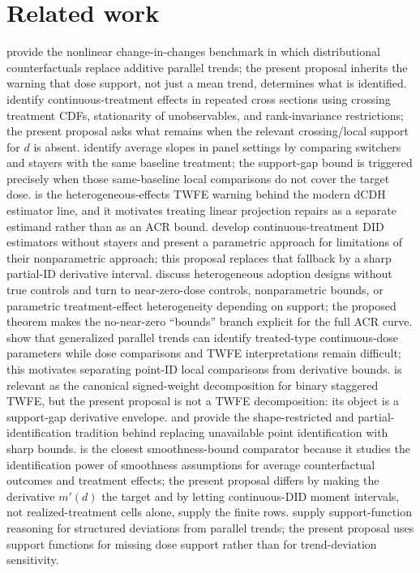 \documentclass[11pt]{article}
\theoremstyle{definition}
\theoremstyle{plain}
\theoremstyle{remark}
\begin{document}
\section{Related work}
\citet{AtheyImbens2006} provide the nonlinear change-in-changes benchmark in which distributional counterfactuals replace additive parallel trends; the present proposal inherits the warning that dose support, not just a mean trend, determines what is identified.  \citet{DHaultfoeuilleHoderleinSasaki2023} identify continuous-treatment effects in repeated cross sections using crossing treatment CDFs, stationarity of unobservables, and rank-invariance restrictions; the present proposal asks what remains when the relevant crossing/local support for \(d\) is absent.  \citet{deChaisemartinDHaultfoeuillePasquierSowVazquezBare2022} identify average slopes in panel settings by comparing switchers and stayers with the same baseline treatment; the support-gap bound is triggered precisely when those same-baseline local comparisons do not cover the target dose.  \citet{DCDH2020} is the heterogeneous-effects TWFE warning behind the modern dCDH estimator line, and it motivates treating linear projection repairs as a separate estimand rather than as an ACR bound.  \citet{deChaisemartinDHaultfoeuilleVazquezBare2024} develop continuous-treatment DID estimators without stayers and present a parametric approach for limitations of their nonparametric approach; this proposal replaces that fallback by a sharp partial-ID derivative interval.  \citet{deChaisemartinCicciaDHaultfoeuilleKnau2024} discuss heterogeneous adoption designs without true controls and turn to near-zero-dose controls, nonparametric bounds, or parametric treatment-effect heterogeneity depending on support; the proposed theorem makes the no-near-zero ``bounds'' branch explicit for the full ACR curve.  \citet{CallawayGoodmanBaconSantAnna2024} show that generalized parallel trends can identify treated-type continuous-dose parameters while dose comparisons and TWFE interpretations remain difficult; this motivates separating point-ID local comparisons from derivative bounds.  \citet{GoodmanBacon2021} is relevant as the canonical signed-weight decomposition for binary staggered TWFE, but the present proposal is not a TWFE decomposition: its object is a support-gap derivative envelope.  \citet{Manski1997} and \citet{Manski2003} provide the shape-restricted and partial-identification tradition behind replacing unavailable point identification with sharp bounds.  \citet{KimKwonKwonLee2018} is the closest smoothness-bound comparator because it studies the identification power of smoothness assumptions for average counterfactual outcomes and treatment effects; the present proposal differs by making the derivative \(m'(d)\) the target and by letting continuous-DID moment intervals, not realized-treatment cells alone, supply the finite rows.  \citet{RambachanRoth2023} supply support-function reasoning for structured deviations from parallel trends; the present proposal uses support functions for missing dose support rather than for trend-deviation sensitivity.
\end{document}
